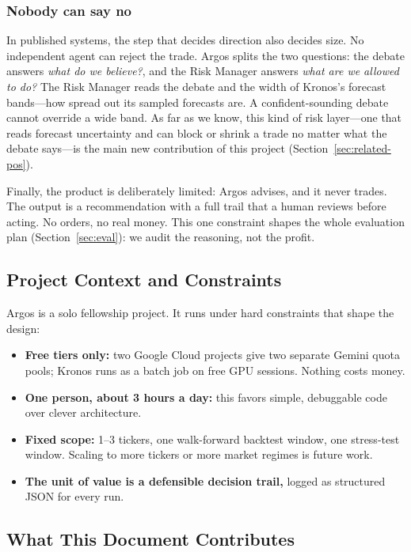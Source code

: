 \documentclass[conference]{IEEEtran}
\newcommand{\sys}{Argos}
\begin{document}
\subsubsection{Nobody can say no} In published systems, the step that decides direction also decides size. No independent agent can reject the trade. \sys{} splits the two questions: the debate answers \emph{what do we believe?}, and the Risk Manager answers \emph{what are we allowed to do?} The Risk Manager reads the debate and the width of Kronos's forecast bands---how spread out its sampled forecasts are. A confident-sounding debate cannot override a wide band. As far as we know, this kind of risk layer---one that reads forecast uncertainty and can block or shrink a trade no matter what the debate says---is the main new contribution of this project (Section~\ref{sec:related-pos}).

Finally, the product is deliberately limited: \sys{} advises, and it never trades. The output is a recommendation with a full trail that a human reviews before acting. No orders, no real money. This one constraint shapes the whole evaluation plan (Section~\ref{sec:eval}): we audit the reasoning, not the profit.

\subsection{Project Context and Constraints}

\sys{} is a solo fellowship project. It runs under hard constraints that shape the design:

\begin{itemize}[leftmargin=*,itemsep=1pt,topsep=2pt]
  \item \textbf{Free tiers only:} two Google Cloud projects give two separate Gemini quota pools; Kronos runs as a batch job on free GPU sessions. Nothing costs money.
  \item \textbf{One person, about 3 hours a day:} this favors simple, debuggable code over clever architecture.
  \item \textbf{Fixed scope:} 1--3 tickers, one walk-forward backtest window, one stress-test window. Scaling to more tickers or more market regimes is future work.
  \item \textbf{The unit of value is a defensible decision trail,} logged as structured JSON for every run.
\end{itemize}

\subsection{What This Document Contributes}
\end{document}
